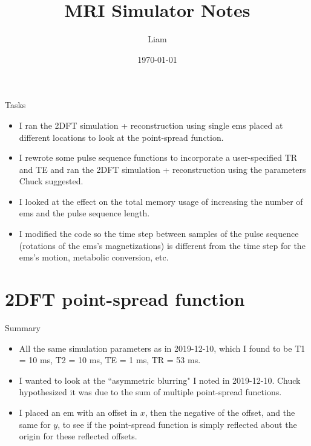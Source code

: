 \documentclass[dvipsnames]{beamer}
\title{MRI Simulator Notes}
\author{Liam}
\date{\today}
\begin{document}
\begin{frame}
\maketitle
\end{frame}

\begin{frame}{Tasks}
\begin{itemize}
\item I ran the 2DFT simulation + reconstruction using single ems placed at different locations to look at the point-spread function.
\item I rewrote some pulse sequence functions to incorporate a user-specified TR and TE and ran the 2DFT simulation + reconstruction using the parameters Chuck suggested.
\item I looked at the effect on the total memory usage of increasing the number of ems and the pulse sequence length.
\item I modified the code so the time step between samples of the pulse sequence (rotations of the ems's magnetizations) is different from the time step for the ems's motion, metabolic conversion, etc.
\end{itemize}
\end{frame}

\section{2DFT point-spread function}

\begin{frame}{Summary}
\begin{itemize}
\item All the same simulation parameters as in 2019-12-10, which I found to be T1 = 10 ms, T2 = 10 ms, TE = 1 ms, TR = 53 ms.
\item I wanted to look at the ``asymmetric blurring" I noted in 2019-12-10. Chuck hypothesized it was due to the sum of multiple point-spread functions.
\item I placed an em with an offset in $x$, then the negative of the offset, and the same for $y$, to see if the point-spread function is simply reflected about the origin for these reflected offsets.
\end{itemize}
\end{frame}

\begin{frame}
\begin{center}
\texttt{[image: \{reconstruction\_x-0.5\_y-0.0]}.pdf}
\end{center}
\end{frame}
\end{document}
